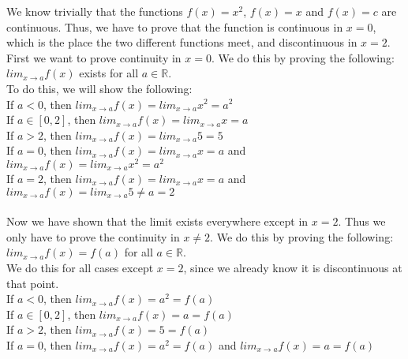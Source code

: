 We know trivially that the functions $f(x) = x^2$, $f(x) = x$ and $f(x) = c$ are continuous. Thus, we have to prove that the function is continuous in $x= 0$, which is the place the two different functions meet, and discontinuous in $x=2$. \\
First we want to prove continuity in $x=0$. We do this by proving the following:\\
$lim_{x \to a}f(x)$ exists for all $a \in \mathbb{R}$.\\
To do this, we will show the following:\\
If $a<0$, then $lim_{x \to a} f(x) =  lim_{x \to a} x^2 = a^2	$\\
If $a\in [0,2]$, then $lim_{x \to a} f(x) = lim_{x \to a}x = a$\\
If $a>2$, then $lim_{x \to a} f(x) = lim_{x \to a} 5 = 5$\\
If $a=0$, then $lim_{x \to a} f(x) =  lim_{x \to a}x = a$ and $lim_{x \to a} f(x) =  lim_{x \to a}x^2 = a^2$\\
If $a=2$, then $lim_{x \to a} f(x) = lim_{x \to a}x = a$ and $lim_{x \to a} f(x) = lim_{x \to a}5 \not = a = 2$\\\\
Now we have shown that the limit exists everywhere except in $x=2$. Thus we only have to prove the continuity in $x \neq 2$. We do this by proving the following:\\
$lim_{x \to a} f(x) = f(a)$ for all $a \in \mathbb{R}$.\\
We do this for all cases except $x=2$, since we already know it is discontinuous at that point.\\
If $a < 0$, then $lim_{x \to a} f(x) = a^2 = f(a)$\\
If $a \in [0,2]$, then $lim_{x \to a} f(x) = a = f(a)$\\
If $a > 2$, then $lim_{x \to a} f(x) = 5 = f(a)$\\
If $a = 0$, then $lim_{x \to a} f(x) = a^2 = f(a)$ and $lim_{x \to a} f(x) = a = f(a)$